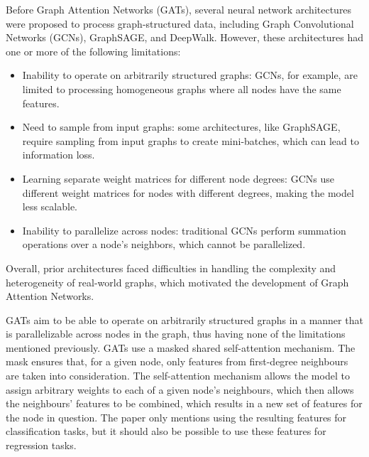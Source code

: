 Before Graph Attention Networks (GATs), several neural network architectures were proposed to process graph-structured data, including Graph Convolutional Networks (GCNs), GraphSAGE, and DeepWalk. However, these architectures had one or more of the following limitations:

\begin{itemize}
    \item Inability to operate on arbitrarily structured graphs: GCNs, for example, are limited to processing homogeneous graphs where all nodes have the same features.

    \item Need to sample from input graphs: some architectures, like GraphSAGE, require sampling from input graphs to create mini-batches, which can lead to information loss.

    \item Learning separate weight matrices for different node degrees: GCNs use different weight matrices for nodes with different degrees, making the model less scalable.

    \item Inability to parallelize across nodes: traditional GCNs perform summation operations over a node's neighbors, which cannot be parallelized.
\end{itemize}

Overall, prior architectures faced difficulties in handling the complexity and heterogeneity of real-world graphs, which motivated the development of Graph Attention Networks.

GATs aim to be able to operate on arbitrarily structured graphs in a manner
that is parallelizable across nodes in the graph, thus having none of the
limitations mentioned previously. GATs use a masked shared self-attention
mechanism. The mask ensures that, for a given node, only features from
first-degree neighbours are taken into consideration. The self-attention
mechanism allows the model to assign arbitrary weights to each of a given
node's neighbours, which then allows the neighbours' features to be
combined, which results in a new set of features for the node in question.
The paper only mentions using the resulting features for classification
tasks, but it should also be possible to use these features for regression
tasks.
